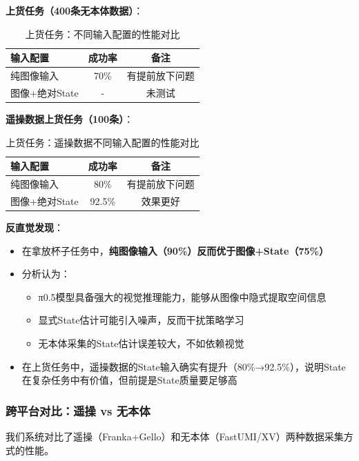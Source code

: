 \textbf{上货任务（400条无本体数据）}：

\begin{table}[htbp]
\centering
\caption{上货任务：不同输入配置的性能对比}
\label{tab:input_config_shelves}
\begin{tabular}{lcc}
\toprule
输入配置 & 成功率 & 备注 \\
\midrule
纯图像输入 & 70\% & 有提前放下问题 \\
图像+绝对State & - & 未测试 \\
\bottomrule
\end{tabular}
\end{table}

\textbf{遥操数据上货任务（100条）}：

\begin{table}[htbp]
\centering
\caption{上货任务：遥操数据不同输入配置的性能对比}
\label{tab:input_config_shelves_teleop}
\begin{tabular}{lcc}
\toprule
输入配置 & 成功率 & 备注 \\
\midrule
纯图像输入 & 80\% & 有提前放下问题 \\
图像+绝对State & 92.5\% & 效果更好 \\
\bottomrule
\end{tabular}
\end{table}

\textbf{反直觉发现}：
\begin{itemize}[leftmargin=2em]
    \item 在拿放杯子任务中，\textbf{纯图像输入（90\%）反而优于图像+State（75\%）}
    \item 分析认为：
    \begin{itemize}
        \item π0.5模型具备强大的视觉推理能力，能够从图像中隐式提取空间信息
        \item 显式State估计可能引入噪声，反而干扰策略学习
        \item 无本体采集的State估计误差较大，不如依赖视觉
    \end{itemize}
    \item 在上货任务中，遥操数据的State输入确实有提升（80\%→92.5\%），说明State在复杂任务中有价值，但前提是State质量要足够高
\end{itemize}

\subsubsection{跨平台对比：遥操 vs 无本体}

我们系统对比了遥操（Franka+Gello）和无本体（FastUMI/XV）两种数据采集方式的性能。


